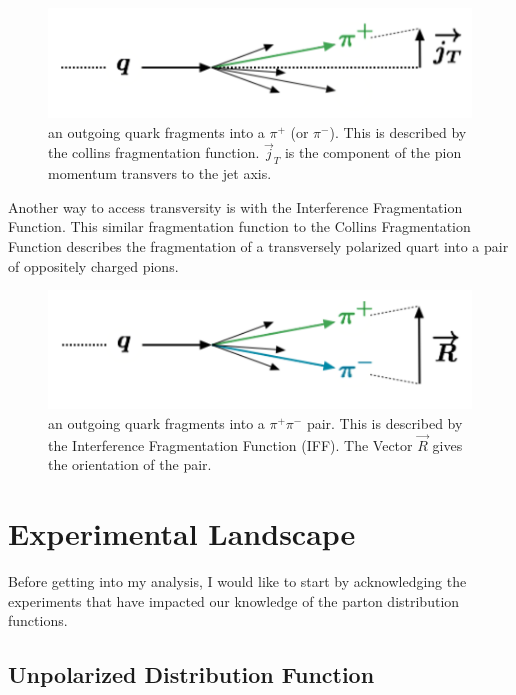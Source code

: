 \documentclass[abstract = on,listof=totoc, bibliography=totoc]{scrreprt}
\begin{document}
\begin{figure}
\begin{center}
\includegraphics[width = .7\textwidth]{otherFrac2}
\caption[Collins Fragmentation Function]{an outgoing quark fragments into a $\pi^+$ (or $\pi^-$). This is described by the collins fragmentation function. $\vec{j}_T$ is the component of the pion momentum transvers to the jet axis.} 
\label{fig:collins}
\end{center}
\end{figure}


Another way to access transversity is with the Interference Fragmentation Function. This similar fragmentation function to the Collins Fragmentation Function describes the fragmentation of a transversely polarized quart into a pair of oppositely charged pions.    


\begin{figure}
\begin{center}
\includegraphics[width = .7\textwidth]{IFFwrite}
\caption[Interference Fragmentation Function]{an outgoing quark fragments into a $\pi^+\pi^-$ pair. This is described by the Interference Fragmentation Function (IFF). The Vector $\vec{R}$ gives the orientation of the pair.}
\label{fig:IFF}
\end{center}
\end{figure}



\chapter{Experimental Landscape}

Before getting into my analysis, I would like to start by acknowledging the experiments that have impacted our knowledge of the parton distribution functions. 

\section{Unpolarized Distribution Function}
\end{document}
